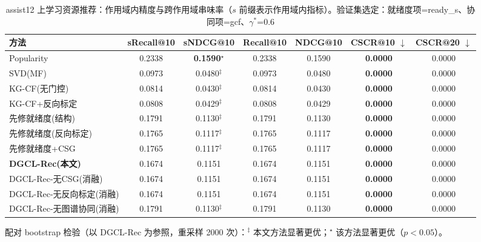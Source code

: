 \begin{table}[htbp]
\centering
\caption{assist12 上学习资源推荐：作用域内精度与跨作用域串味率（$s$ 前缀表示作用域内指标）。验证集选定：就绪度项=ready_s、协同项=gcf、$\gamma^\ast$=0.6}
\label{tab:rec_assist12}
\begin{tabular}{lcccccc}
\toprule
方法 & sRecall@10 & sNDCG@10 & Recall@10 & NDCG@10 & CSCR@10 $\downarrow$ & CSCR@20 $\downarrow$ \\
\midrule
Popularity & 0.2338 & \textbf{0.1590}$^{\star}$ & 0.2338 & 0.1590 & \textbf{0.0000} & 0.0000 \\
SVD(MF) & 0.0973 & 0.0480$^{\ddagger}$ & 0.0973 & 0.0480 & \textbf{0.0000} & 0.0000 \\
KG-CF(无门控) & 0.0814 & 0.0430$^{\ddagger}$ & 0.0814 & 0.0430 & \textbf{0.0000} & 0.0000 \\
KG-CF+反向标定 & 0.0808 & 0.0429$^{\ddagger}$ & 0.0808 & 0.0429 & \textbf{0.0000} & 0.0000 \\
先修就绪度(结构) & 0.1791 & 0.1130$^{\ddagger}$ & 0.1791 & 0.1130 & \textbf{0.0000} & 0.0000 \\
先修就绪度(反向标定) & 0.1765 & 0.1117$^{\ddagger}$ & 0.1765 & 0.1117 & \textbf{0.0000} & 0.0000 \\
先修就绪度+CSG & 0.1765 & 0.1117$^{\ddagger}$ & 0.1765 & 0.1117 & \textbf{0.0000} & 0.0000 \\
\textbf{DGCL-Rec(本文)} & 0.1674 & 0.1151 & 0.1674 & 0.1151 & \textbf{0.0000} & 0.0000 \\
DGCL-Rec-无CSG(消融) & 0.1674 & 0.1151 & 0.1674 & 0.1151 & \textbf{0.0000} & 0.0000 \\
DGCL-Rec-无反向标定(消融) & 0.1674 & 0.1151 & 0.1674 & 0.1151 & \textbf{0.0000} & 0.0000 \\
DGCL-Rec-无图谱协同(消融) & 0.1791 & 0.1130$^{\ddagger}$ & 0.1791 & 0.1130 & \textbf{0.0000} & 0.0000 \\
\bottomrule
\end{tabular}
\par\smallskip\footnotesize 配对 bootstrap 检验（以 DGCL-Rec 为参照，重采样 2000 次）：$^{\ddagger}$ 本文方法显著更优；$^{\star}$ 该方法显著更优（$p<0.05$）。
\end{table}